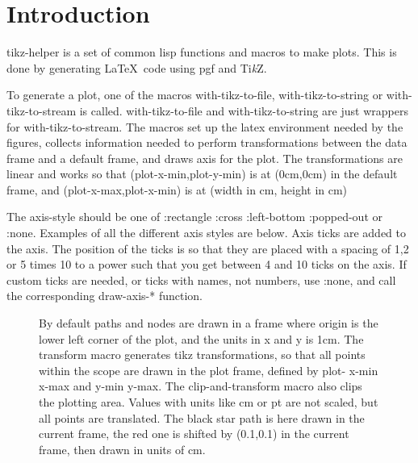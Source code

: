\documentclass{article}
\begin{document}
\section{Introduction}


tikz-helper is a set of common lisp functions and macros to make plots. This is done by 
generating \LaTeX \ code using pgf and {Ti\textit{k}Z}.



To generate a plot, one of the macros with-tikz-to-file, with-tikz-to-string or with-tikz-to-stream is called.
with-tikz-to-file and with-tikz-to-string are just wrappers for with-tikz-to-stream.
The macros set up the latex environment needed by the figures, collects information needed to perform 
transformations between the data frame and a default frame, and draws axis for the plot. The transformations are
linear and works so that (plot-x-min,plot-y-min) is at (0cm,0cm) in the default frame, and  (plot-x-max,plot-x-min) is at (width in cm, height in cm)



The axis-style should be one of :rectangle :cross :left-bottom :popped-out or :none.
Examples of all the different axis styles are below. Axis ticks are added to the axis. The position of the ticks is so
that they are placed with a spacing of 1,2 or 5 times 10 to a power such that you get between 4 and 10 ticks on the 
axis. If custom ticks are needed, or ticks with names, not numbers, use :none, and call the corresponding draw-axis-*
function.

\begin{figure}[H]
\centering

\captionsetup{singlelinecheck=off}
\caption[asdf]{By default paths and nodes are drawn in a frame where origin is the lower left corner of the plot,
and the units in x and y is 1cm. The transform macro generates tikz transformations, so that all points
within the scope are drawn in the plot frame, defined by plot- x-min x-max and y-min y-max.
 The clip-and-transform macro also clips the plotting area. Values with units like cm or pt are not scaled, 
but all points are translated. The black star path is here drawn in the current frame, the red one 
is shifted by (0.1,0.1) in the current frame, then drawn in units of cm.}
\end{figure}
\end{document}
